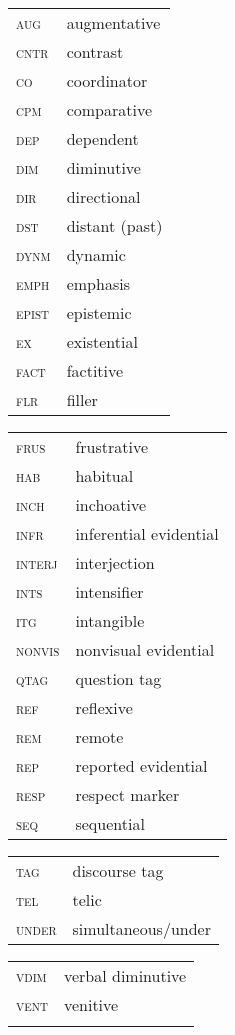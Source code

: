 \documentclass[output=paper,
modfonts,nonflat
]{langsci/langscibook}
\begin{document}
\begin{tabularx}{.45\textwidth}{lQ}
\textsc{aug} & augmentative \\
\textsc{cntr} & contrast \\
\textsc{co} & coordinator \\
\textsc{cpm} & comparative \\
\textsc{dep} & dependent \\
\textsc{dim} & diminutive \\
\textsc{dir} & directional \\
\textsc{dst} & distant (past) \\
\textsc{dynm} & dynamic \\
\textsc{emph} & emphasis \\
\textsc{epist} & epistemic \\
\textsc{ex} & existential \\
\textsc{fact} & factitive \\
\textsc{flr} & filler \\
\end{tabularx}
\begin{tabularx}{.45\textwidth}{lQ}
\textsc{frus} & frustrative \\
\textsc{hab} & habitual \\
\textsc{inch} & inchoative \\
\textsc{infr} & inferential evidential \\
\textsc{interj} & interjection \\
\textsc{ints} & intensifier \\
\textsc{itg} & intangible \\
\textsc{nonvis} & nonvisual evidential \\
\textsc{qtag} & question tag \\
\textsc{ref} & reflexive \\
\textsc{rem} & remote \\
\textsc{rep} & reported evidential \\
\textsc{resp} & respect marker \\
\textsc{seq} & sequential \\
\end{tabularx}

\begin{tabularx}{.45\textwidth}{lQ}
\textsc{tag} & discourse tag \\
\textsc{tel} & telic \\
\textsc{under} & simultaneous/under \\
\end{tabularx}
\begin{tabularx}{.45\textwidth}{lQ}
\textsc{vdim} & verbal diminutive \\
\textsc{vent} & venitive \\
\\
\end{tabularx}
 
 
\nocite{ Aikhenvald2002, Cardoso2007, Epps2005/2016, Epps2007, Epps2008, Epps2010, EppsandBolaños2017, EppsandStenzel2013, Gomez-Imbert1996, LondoñoSulkin2005, Oliveira2010, Chernela1993, Santos-Granero2006, Stenzel2013, Uzendowski2005, Vilaça2000, ViveirosdeCastro1998}

{\sloppy
\printbibliography[heading=subbibliography,notkeyword=this]
}
\end{document}
